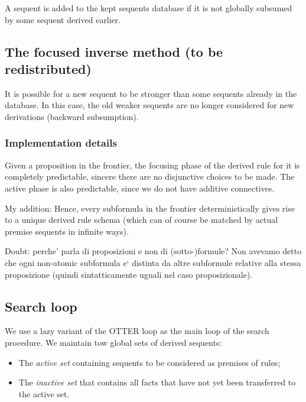 \documentclass{article}
\theoremstyle{definition}
\begin{document}
A sequent is added to the kept sequents database if it is not globally subsumed
by some sequent derived earlier.

\subsection{The focused inverse method (to be redistributed)}


It is possible for a new sequent to be stronger than some sequents already in
the database. In this case, the old weaker sequents are no longer considered for
new derivations (backward subsumption).

\subsubsection{Implementation details}


Given a proposition in the frontier, the focusing phase of the derived rule for
it is completely predictable, sincere there are no disjunctive choices to be
made. The active phase is also predictable, since we do not have additive
connectives.

My addition: Hence, every subformula in the frontier deterministically gives
rise to a unique derived rule schema (which can of course be matched by actual
premise sequents in infinite ways).

Doubt: perche' parla di proposizioni e non di (sotto-)formule? Non avevamo detto
che ogni non-atomic subformula e` distinta da altre subformule relative alla
stessa proposizione (quindi sintatticamente uguali nel caso proposizionale).

\subsection{Search loop}


We use a lazy variant of the OTTER loop as the main loop of the search
procedure. We maintain tow global sets of derived sequents:

\begin{itemize}
\item The \emph{active set} containing sequents to be considered as premises of
  rules;
\item The \emph{inactive set} that contains all facts that have not yet been
  transferred to the active set.
\end{itemize}
\end{document}
